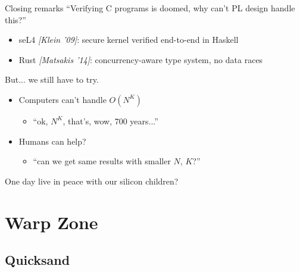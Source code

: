 \documentclass[xcolor=dvipsnames]{beamer}
\begin{document}
\begin{frame}{Closing remarks}
	``Verifying C programs is doomed, why can't PL design handle this?''
	\begin{itemize}
		\item seL4 {\em [Klein '09]}: secure kernel verified end-to-end in Haskell
		\item Rust {\em [Matsakis '14]}: concurrency-aware type system, no data races
	\end{itemize}
	\pause
	\linegap

	But... we still have to try.
	\begin{itemize}
		\item Computers can't handle $O(N^K)$
			\begin{itemize}
				\item ``ok, $N^K$, that's, wow, 700 years...''
			\end{itemize}
		\item Humans can help?
			\begin{itemize}
				\item ``can we get same results with smaller $N$, $K$?''
			\end{itemize}
	\end{itemize}
	\pause
	\linegap

	One day live in peace with our silicon children?
\end{frame}



\section{Warp Zone}

\subsection{Quicksand}
\end{document}
